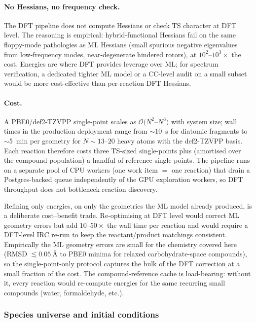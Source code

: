 \paragraph{No Hessians, no frequency check.}
The DFT pipeline does not compute Hessians or check TS character at DFT level. The reasoning is empirical: hybrid-functional Hessians fail on the same floppy-mode pathologies as ML Hessians (small spurious negative eigenvalues from low-frequency modes, near-degenerate hindered rotors), at $10^2$--$10^3\times$ the cost. Energies are where DFT provides leverage over ML; for spectrum verification, a dedicated tighter ML model or a CC-level audit on a small subset would be more cost-effective than per-reaction DFT Hessians.

\paragraph{Cost.}
A PBE0/def2-TZVPP single-point scales as $\mathcal{O}(N^{2}$--$N^{3})$ with system size; wall times in the production deployment range from $\sim$\SI{10}{s} for diatomic fragments to $\sim$\SI{5}{min} per geometry for $N \sim 13$--$20$ heavy atoms with the def2-TZVPP basis. Each reaction therefore costs three TS-sized single-points plus (amortised over the compound population) a handful of reference single-points. The pipeline runs on a separate pool of CPU workers (one work item $=$ one reaction) that drain a Postgres-backed queue independently of the GPU exploration workers, so DFT throughput does not bottleneck reaction discovery.

Refining only energies, on only the geometries the ML model already produced, is a deliberate cost--benefit trade. Re-optimising at DFT level would correct ML geometry errors but add $10$--$50\times$ the wall time per reaction and would require a DFT-level IRC re-run to keep the reactant/product matchings consistent. Empirically the ML geometry errors are small for the chemistry covered here (RMSD $\lesssim \SI{0.05}{\angstrom}$ to PBE0 minima for relaxed carbohydrate-space compounds), so the single-point-only protocol captures the bulk of the DFT correction at a small fraction of the cost. The compound-reference cache is load-bearing: without it, every reaction would re-compute energies for the same recurring small compounds (water, formaldehyde, etc.).


\subsubsection{Species universe and initial conditions}
\label{sec:kinetics-ic}

